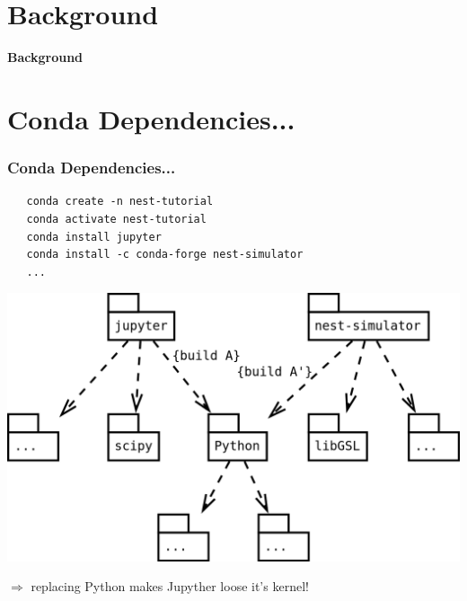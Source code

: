 \documentclass[
	t, %
	10pt, %
	aspectratio=1610, %
	ngerman,
	english,
	]{beamer}
\begin{document}
\def\ttl{Background}
\section{\ttl}
\begin{frame}[fragile]
  \vspace*{.45\textheight}
  \begin{center}
  {\Large \textbf{\ttl}}
  \end{center}
\end{frame}

\def\ttl{Conda Dependencies...}
\section{\ttl}
\begin{frame}[fragile]
  \frametitle{\ttl}

  \begin{lstlisting}
   conda create -n nest-tutorial
   conda activate nest-tutorial
   conda install jupyter
   conda install -c conda-forge nest-simulator
   ...
  \end{lstlisting}
  \begin{center}
   \includegraphics[height=.4\textheight]{figures/conda-dependency-management.png}

  \vspace*{.2cm}$\Rightarrow$ replacing Python makes Jupyther loose it's kernel!
  \end{center}
\end{frame}
\end{document}
